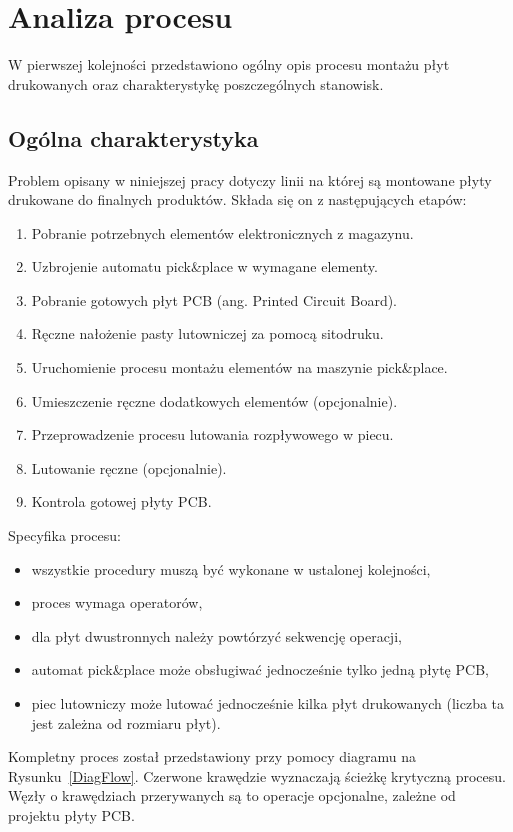 \chapter{Analiza procesu}

W pierwszej kolejności przedstawiono ogólny opis procesu montażu płyt drukowanych oraz charakterystykę poszczególnych stanowisk.

\section{Ogólna charakterystyka}
Problem opisany w  niniejszej pracy dotyczy linii na której są montowane płyty drukowane do finalnych produktów.
Składa się on z następujących etapów:
\begin{enumerate}
	\item Pobranie potrzebnych elementów elektronicznych z magazynu.
	\item Uzbrojenie automatu pick\&place w wymagane elementy.
	\item Pobranie gotowych płyt PCB (ang. Printed Circuit Board).
	\item Ręczne nałożenie pasty lutowniczej za pomocą sitodruku.
	\item Uruchomienie procesu montażu elementów na maszynie pick\&place.
	\item Umieszczenie ręczne dodatkowych elementów (opcjonalnie).
	\item Przeprowadzenie procesu lutowania rozpływowego w piecu.
	\item Lutowanie ręczne (opcjonalnie).
	\item Kontrola gotowej płyty PCB\@.
\end{enumerate}

\breakparagraph{}
Specyfika procesu:
\begin{itemize}
	\item wszystkie procedury muszą być wykonane w ustalonej kolejności,
	\item proces wymaga operatorów,
	\item dla płyt dwustronnych należy powtórzyć sekwencję operacji,
	\item automat pick\&place może obsługiwać jednocześnie tylko jedną płytę PCB,
	\item piec lutowniczy może lutować jednocześnie kilka płyt drukowanych (liczba ta jest zależna od rozmiaru płyt).
\end{itemize}

Kompletny proces został przedstawiony przy pomocy diagramu na Rysunku~\ref{DiagFlow}.
Czerwone krawędzie wyznaczają ścieżkę krytyczną procesu.
Węzły o krawędziach przerywanych są to operacje opcjonalne, zależne od projektu płyty PCB\@.

